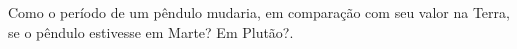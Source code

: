 Como o período de um pêndulo mudaria, em comparação com seu valor na Terra, se o pêndulo estivesse em Marte? Em Plutão?.

